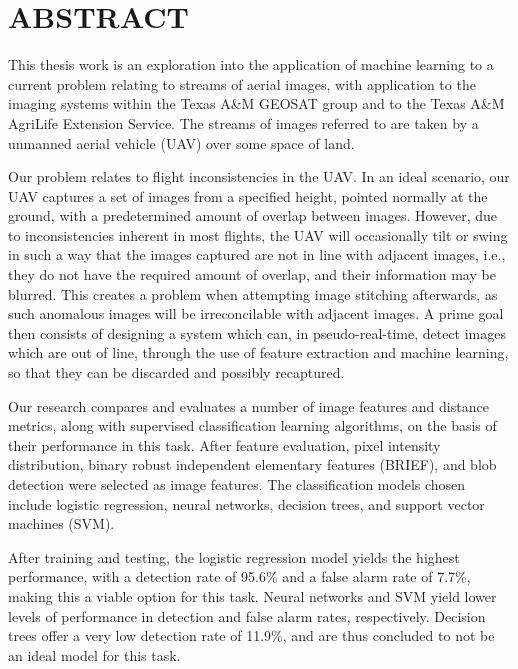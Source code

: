 
\chapter*{ABSTRACT}

\pagestyle{plain} %
\setcounter{page}{2}

\indent This thesis work is an exploration into the application of machine learning to a current problem relating to streams of aerial images, with application to the imaging systems within the Texas A\&M GEOSAT group and to the Texas A\&M AgriLife Extension Service.
The streams of images referred to are taken by a unmanned aerial vehicle (UAV) over some space of land.

Our problem relates to flight inconsistencies in the UAV.
In an ideal scenario, our UAV captures a set of images from a specified height, pointed normally at the ground, with a predetermined amount of overlap between images.
However, due to inconsistencies inherent in most flights, the UAV will occasionally tilt or swing in such a way that the images captured are not in line with adjacent images, i.e., they do not have the required amount of overlap, and their information may be blurred.
This creates a problem when attempting image stitching afterwards, as such anomalous images will be irreconcilable with adjacent images.
A prime goal then consists of designing a system which can, in pseudo-real-time, detect images which are out of line, through the use of feature extraction and machine learning, so that they can be discarded and possibly recaptured.

Our research compares and evaluates a number of image features and distance metrics, along with supervised classification learning algorithms, on the basis of their performance in this task.
After feature evaluation, pixel intensity distribution, binary robust independent elementary features (BRIEF), and blob detection were selected as image features.
The classification models chosen include logistic regression, neural networks, decision trees, and support vector machines (SVM).

After training and testing, the logistic regression model yields the highest performance, with a detection rate of 95.6\% and a false alarm rate of 7.7\%, making this a viable option for this task.
Neural networks and SVM yield lower levels of performance in detection and false alarm rates, respectively.
Decision trees offer a very low detection rate of 11.9\%, and are thus concluded to not be an ideal model for this task.


\pagebreak{}

